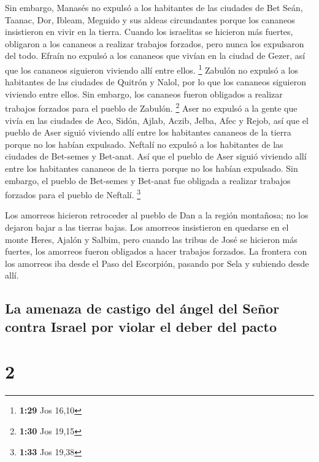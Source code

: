  Sin embargo, Manasés no expulsó a los habitantes de las
ciudades de Bet Seán, Taanac, Dor, Ibleam, Meguido y sus aldeas
circundantes porque los cananeos insistieron en vivir en la tierra.
 Cuando los israelitas se hicieron más fuertes, obligaron
a los cananeos a realizar trabajos forzados, pero nunca los expulsaron
del todo.  Efraín no expulsó a los cananeos que vivían en
la ciudad de Gezer, así que los cananeos siguieron viviendo allí entre
ellos. \footnote{\textbf{1:29} Jos 16,10}  Zabulón no
expulsó a los habitantes de las ciudades de Quitrón y Nalol, por lo que
los cananeos siguieron viviendo entre ellos. Sin embargo, los cananeos
fueron obligados a realizar trabajos forzados para el pueblo de Zabulón.
\footnote{\textbf{1:30} Jos 19,15}  Aser no expulsó a la
gente que vivía en las ciudades de Aco, Sidón, Ajlab, Aczib, Jelba, Afec
y Rejob,  así que el pueblo de Aser siguió viviendo allí
entre los habitantes cananeos de la tierra porque no los habían
expulsado.  Neftalí no expulsó a los habitantes de las
ciudades de Bet-semes y Bet-anat. Así que el pueblo de Aser siguió
viviendo allí entre los habitantes cananeos de la tierra porque no los
habían expulsado. Sin embargo, el pueblo de Bet-semes y Bet-anat fue
obligada a realizar trabajos forzados para el pueblo de Neftalí.
\footnote{\textbf{1:33} Jos 19,38}

 Los amorreos hicieron retroceder al pueblo de Dan a la
región montañosa; no los dejaron bajar a las tierras bajas.
 Los amorreos insistieron en quedarse en el monte Heres,
Ajalón y Salbim, pero cuando las tribus de José se hicieron más fuertes,
los amorreos fueron obligados a hacer trabajos forzados. 
La frontera con los amorreos iba desde el Paso del Escorpión, pasando
por Sela y subiendo desde allí.

\hypertarget{la-amenaza-de-castigo-del-uxe1ngel-del-seuxf1or-contra-israel-por-violar-el-deber-del-pacto}{%
\subsection{La amenaza de castigo del ángel del Señor contra Israel por
violar el deber del
pacto}\label{la-amenaza-de-castigo-del-uxe1ngel-del-seuxf1or-contra-israel-por-violar-el-deber-del-pacto}}

\hypertarget{section-1}{%
\section{2}\label{section-1}}

